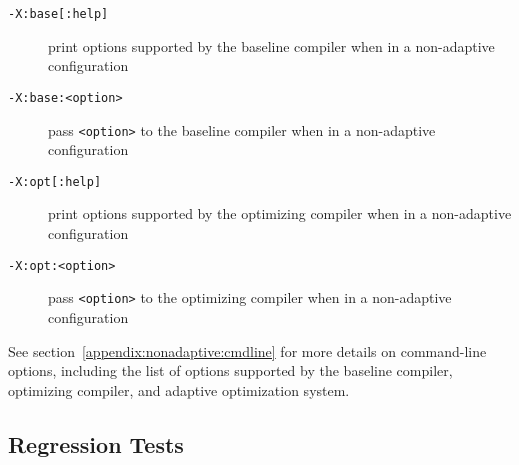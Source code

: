 \begin{description}
\item[{\tt -X:base[:help]}]
print options supported by the baseline compiler when in a 
non-adaptive configuration

\item[{\tt -X:base:<option>}]
pass {\tt <option>} to the baseline compiler when in a non-adaptive configuration

\item[{\tt -X:opt[:help]}]
print options supported by the optimizing compiler when in a 
non-adaptive configuration

\item[{\tt -X:opt:<option>}]
pass {\tt <option>} to the optimizing compiler when in a non-adaptive configuration

\end{description}

See section~\ref{appendix:nonadaptive:cmdline} for more details on 
command-line options, including the list of options supported by the 
baseline compiler, optimizing compiler, and adaptive optimization system.

\JikesTMFooter

\JavaTMFooter

\subsection{Regression Tests}

